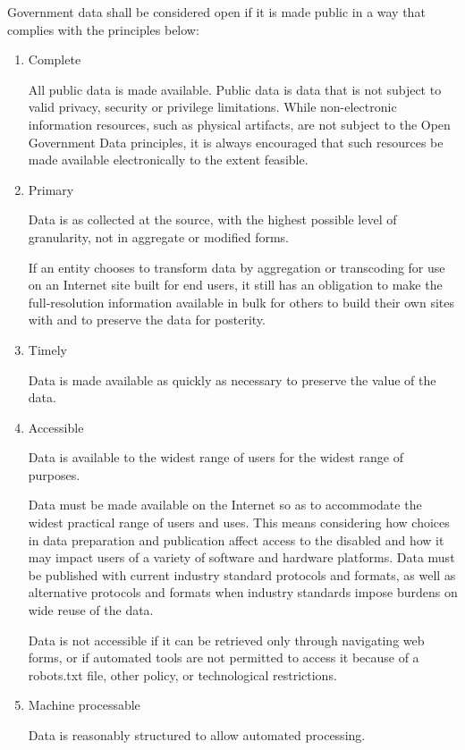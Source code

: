 \documentclass[12pt]{article}
\begin{document}
Government data shall be considered open if it is made public in a way that complies with the principles below:
\begin{enumerate}
\item Complete

All public data is made available. Public data is data that is not subject to valid privacy, security or privilege limitations.
While non-electronic information resources, such as physical artifacts, are not subject to the Open Government Data principles, it is always encouraged that such resources be made available electronically to the extent feasible.

\item Primary

Data is as collected at the source, with the highest possible level of granularity, not in aggregate or modified forms.

If an entity chooses to transform data by aggregation or transcoding for use on an Internet site built for end users, it still has an obligation to make the full-resolution information available in bulk for others to build their own sites with and to preserve the data for posterity.

\item Timely

Data is made available as quickly as necessary to preserve the value of the data.

\item Accessible

Data is available to the widest range of users for the widest range of purposes.

Data must be made available on the Internet so as to accommodate the widest practical range of users and uses. This means considering how choices in data preparation and publication affect access to the disabled and how it may impact users of a variety of software and hardware platforms. Data must be published with current industry standard protocols and formats, as well as alternative protocols and formats when industry standards impose burdens on wide reuse of the data.

Data is not accessible if it can be retrieved only through navigating web forms, or if automated tools are not permitted to access it because of a robots.txt file, other policy, or technological restrictions.

\item Machine processable

Data is reasonably structured to allow automated processing.


\end{enumerate}
\end{document}
